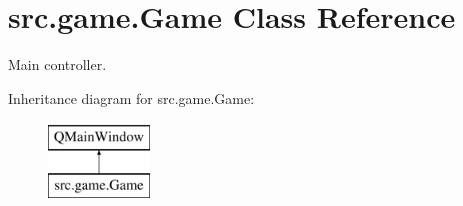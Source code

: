 \hypertarget{classsrc_1_1game_1_1_game}{}\section{src.\+game.\+Game Class Reference}
\label{classsrc_1_1game_1_1_game}


Main controller.  


Inheritance diagram for src.\+game.\+Game\+:\begin{figure}[H]
\begin{center}
\leavevmode
\includegraphics[height=2.000000cm]{classsrc_1_1game_1_1_game}
\end{center}
\end{figure}
